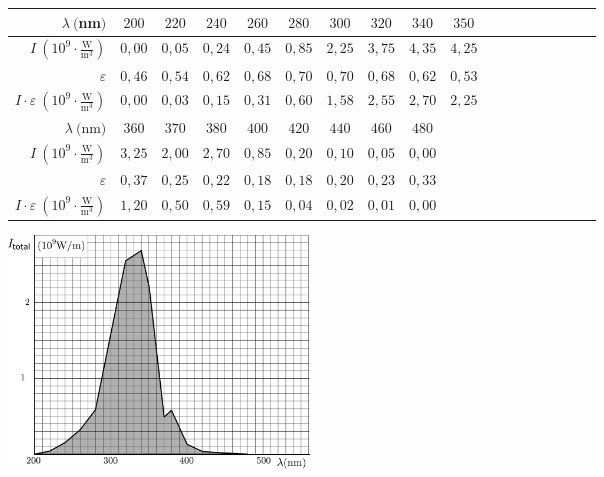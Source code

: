 \documentclass[11pt]{article}
\begin{document}
\begin{tabular}{r|c|c|c|c|c|c|c|c|c|c|c|c|c|c|c|c|c|}
	\hline
	$ \lambda \ ($nm$)                                               $&$ 200  $&$ 220  $&$ 240  $&$ 260  $&$ 280  $&$ 300  $&$ 320  $&$ 340  $&$ 350  $\\
	\hline
	$ I \ (10^9 \cdot \frac{\text{W}}{\text{m}^3})                   $&$ 0,00 $&$ 0,05 $&$ 0,24 $&$ 0,45 $&$ 0,85 $&$ 2,25 $&$ 3,75 $&$ 4,35 $&$ 4,25 $\\
	\hline
	$ \varepsilon                                                    $&$ 0,46 $&$ 0,54 $&$ 0,62 $&$ 0,68 $&$ 0,70 $&$ 0,70 $&$ 0,68 $&$ 0,62 $&$ 0,53 $\\
	\hline
	$ I \cdot \varepsilon \ (10^9 \cdot \frac{\text{W}}{\text{m}^3}) $&$ 0,00 $&$ 0,03 $&$ 0,15 $&$ 0,31 $&$ 0,60 $&$ 1,58 $&$ 2,55 $&$ 2,70 $&$ 2,25 $\\
	\hline
	\hline
	$ \lambda \ ($nm$)                                               $&$ 360  $&$ 370  $&$ 380  $&$ 400  $&$ 420  $&$ 440  $&$ 460  $&$ 480  $\\
	\hline
	$ I \ (10^9 \cdot \frac{\text{W}}{\text{m}^3})                   $&$ 3,25 $&$ 2,00 $&$ 2,70 $&$ 0,85 $&$ 0,20 $&$ 0,10 $&$ 0,05 $&$ 0,00 $\\
	\hline
	$ \varepsilon                                                    $&$ 0,37 $&$ 0,25 $&$ 0,22 $&$ 0,18 $&$ 0,18 $&$ 0,20 $&$ 0,23 $&$ 0,33 $\\
	\hline
	$ I \cdot \varepsilon \ (10^9 \cdot \frac{\text{W}}{\text{m}^3}) $&$ 1,20 $&$ 0,50 $&$ 0,59 $&$ 0,15 $&$ 0,04 $&$ 0,02 $&$ 0,01 $&$ 0,00 $\\ 	
\end{tabular}

\begin{center}
	\includegraphics[width=80mm]{2011-lahg-04-intensity-ing}
\end{center}
\probend
\bigskip

\end{document}
